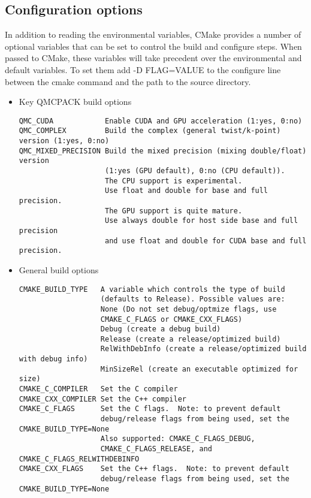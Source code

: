 \subsection{Configuration options}
\label{sec:cmakeoptions}
In addition to reading the environmental variables, CMake provides a
number of optional variables that can be set to control the build and
configure steps.  When passed to CMake, these variables will take
precedent over the environmental and default variables.  To set them
add -D FLAG=VALUE to the configure line between the cmake command and
the path to the source directory.

\begin{itemize}
\item  Key QMCPACK build options
\begin{verbatim}
QMC_CUDA            Enable CUDA and GPU acceleration (1:yes, 0:no)
QMC_COMPLEX         Build the complex (general twist/k-point) version (1:yes, 0:no)
QMC_MIXED_PRECISION Build the mixed precision (mixing double/float) version 
                    (1:yes (GPU default), 0:no (CPU default)).
                    The CPU support is experimental.
                    Use float and double for base and full precision.
                    The GPU support is quite mature.
                    Use always double for host side base and full precision
                    and use float and double for CUDA base and full precision.
\end{verbatim}
  \item General build options
\begin{verbatim}
CMAKE_BUILD_TYPE   A variable which controls the type of build
                   (defaults to Release). Possible values are:
                   None (Do not set debug/optmize flags, use 
                   CMAKE_C_FLAGS or CMAKE_CXX_FLAGS)
                   Debug (create a debug build)
                   Release (create a release/optimized build)
                   RelWithDebInfo (create a release/optimized build with debug info)
                   MinSizeRel (create an executable optimized for size)
CMAKE_C_COMPILER   Set the C compiler
CMAKE_CXX_COMPILER Set the C++ compiler
CMAKE_C_FLAGS      Set the C flags.  Note: to prevent default
                   debug/release flags from being used, set the CMAKE_BUILD_TYPE=None
                   Also supported: CMAKE_C_FLAGS_DEBUG,
                   CMAKE_C_FLAGS_RELEASE, and CMAKE_C_FLAGS_RELWITHDEBINFO
CMAKE_CXX_FLAGS    Set the C++ flags.  Note: to prevent default
                   debug/release flags from being used, set the CMAKE_BUILD_TYPE=None

\end{verbatim}
\end{itemize}
